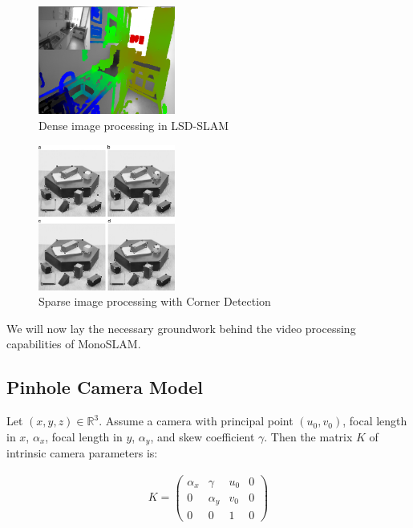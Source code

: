 \documentclass{article}
\begin{document}
\begin{figure}[H]
\begin{center}
\includegraphics[width=0.4\textwidth]{lsd_slam}
\caption{Dense image processing in LSD-SLAM \cite{engel2013iccv}}
\end{center}
\end{figure}

\begin{figure}[H]
\begin{center}
\includegraphics[width=0.4\textwidth]{sparse_image_processing}
\caption{Sparse image processing with Corner Detection \cite{Zhang2015}}
\end{center}
\end{figure}

We will now lay the necessary groundwork behind the video processing capabilities of MonoSLAM. \\

\subsection{Pinhole Camera Model}

Let $(x, y, z) \in \mathbb{R}^3$. Assume a camera with principal point $(u_0, v_0)$, focal length in $x$, $\alpha_x$, focal length in $y$, $\alpha_y$, and skew coefficient $\gamma$. Then the matrix $K$ of intrinsic camera parameters is:

\begin{gather*}
K =
\begin{pmatrix}
\alpha_x & \gamma & u_0 & 0 \\
0 & \alpha_y & v_0 & 0 \\
0 & 0 & 1 & 0
\end{pmatrix} \\
\end{gather*}
\end{document}
